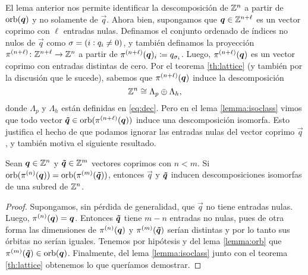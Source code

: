 

El lema anterior nos permite identificar la descomposición de $\mathbb{Z}^n$ a partir de $\operatorname{orb}(\boldsymbol{q})$ y
no solamente de $\vec{q}$. Ahora bien, supongamos que $\boldsymbol{q} \in \mathbb{Z}^{n + \ell}$ es un vector coprimo con
$\ell$ entradas nulas. Definamos el conjunto ordenado de índices no nulos de $\vec{q}$ como $\sigma
= (i \vcentcolon q_i \neq 0)$, y también definamos la proyección $\pi^{(n + \ell)} \colon \mathbb{Z}^{n +
\ell} \to \mathbb{Z}^{n}$ a partir de $\pi^{(n + \ell)}(\boldsymbol{q})_i \coloneq q_{\sigma_i}$. Luego, $\pi^{(n +
\ell)}(\boldsymbol{q})$ es un vector coprimo con entradas distintas de cero. Por el teorema
\ref{th:lattice} (y también por la discusión que le sucede), sabemos que $\pi^{(n + \ell)}(\boldsymbol{q})$
induce la descomposición
\begin{equation*}
	\mathbb{Z}^n \cong \Lambda_p \oplus \Lambda_h,
\end{equation*}
donde $\Lambda_p$ y $\Lambda_h$ están definidas en \eqref{eq:dec}. Pero en el lema
\ref{lemma:isoclass} vimos que todo vector $\boldsymbol{\tilde{q}} \in \operatorname{orb}(\pi^{(n + \ell)}(\boldsymbol{q}))$ induce una
descomposición isomorfa. Esto justifica el hecho de que podamos ignorar las entradas nulas del
vector coprimo $\vec{q}$, y también motiva el siguiente resultado.
\begin{theorem}
	\label{th:isoclass}
	Sean $\boldsymbol{q} \in \mathbb{Z}^n$ y $\boldsymbol{\tilde{q}} \in \mathbb{Z}^m$ vectores coprimos con $n < m$.
	Si $\operatorname{orb}(\pi^{(n)}(\boldsymbol{q})) = \operatorname{orb}(\pi^{(m)}(\boldsymbol{\tilde{q}}))$, entonces $\vec{q}$ y $\boldsymbol{\tilde{q}}$
	inducen descomposiciones isomorfas de una subred de $\mathbb{Z}^n$.
\end{theorem}
\begin{proof}
	Supongamos, sin pérdida de generalidad, que $\vec{q}$ no tiene entradas nulas. Luego,
	$\pi^{(n)}(\boldsymbol{q}) = \boldsymbol{q}$. Entonces $\boldsymbol{\tilde{q}}$ tiene $m - n$ entradas no nulas, pues de otra
	forma las dimensiones de $\pi^{(n)}(\boldsymbol{q})$ y $\pi^{(m)}(\boldsymbol{\tilde{q}})$ serían distintas y por lo
	tanto sus órbitas no serían iguales. Tenemos por hipótesis y del lema \ref{lemma:orb} que
	$\pi^{(m)}(\boldsymbol{\tilde{q}}) \in \operatorname{orb}(\boldsymbol{q})$. Finalmente, del lema \ref{lemma:isoclass} junto
	con el teorema \ref{th:lattice} obtenemos lo que queríamos demostrar.
\end{proof}

